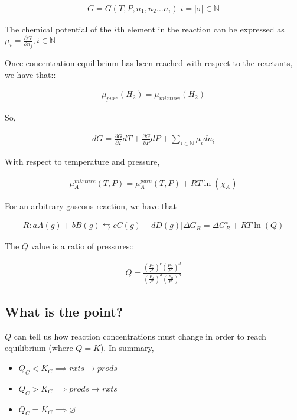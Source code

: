 \documentclass[12pt]{book}
\begin{document}
\begin{align*}
    G=G(T,P,n_1,n_2\ldots n_i)|i=|\sigma|\in \mathbb{N}
\end{align*}

The chemical potential of the $i$th element in the reaction can be expressed as $\mu_i=\frac{\partial G}{\partial n_j}, i\in \mathbb{N}$

Once concentration equilibrium has been reached with respect to the reactants, we have that::

\begin{align*}
    \mu_{pure}(H_2)=\mu_{mixture}(H_2)
\end{align*}

So,

\begin{align*}
    dG=\frac{\partial G}{\partial T}dT+\frac{\partial G}{\partial P}dP+\sum_{i\in \mathbb{N}} \mu_i dn_i
\end{align*}

With respect to temperature and pressure,

\begin{align*}
    \mu_A^{mixture}(T,P)=\mu_A^{pure}(T,P)+RT\ln(\chi_A)
\end{align*}

For an arbitrary gaseous reaction, we have that

\begin{align*}
    R:aA(g)+ bB(g)\leftrightarrows cC(g)+dD(g)|\Delta G_R=\Delta G_R^{\circ}+RT\ln(Q)
\end{align*}

The $Q$ value is a ratio of pressures::

\begin{align*}
    Q=\frac{\left(\frac{P_C}{P^{\circ}}\right)^c\left(\frac{P_D}{P^{\circ}}\right)^d}{\left(\frac{P_A}{P^{\circ}}\right)^a\left(\frac{P_B}{P^{\circ}}\right)^b}
\end{align*}

\subsection*{What is the point?}

$Q$ can tell us how reaction concentrations must change in order to reach equilibrium (where $Q=K$). In summary,

\begin{itemize}
    \item $Q_C<K_C\implies rxts\rightarrow prods$
    \item $Q_C>K_C\implies prods\rightarrow rxts$
    \item $Q_C=K_C\implies \varnothing$
\end{itemize}
\end{document}
